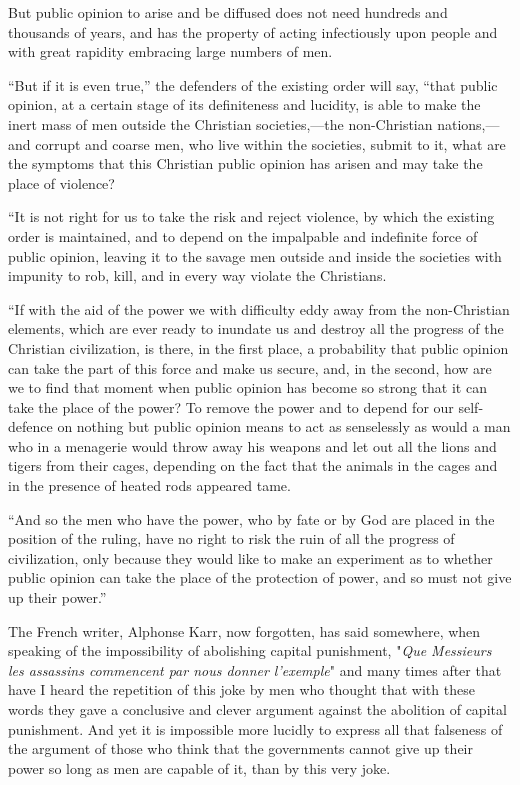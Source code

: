 \documentclass{book}
\begin{document}
But public opinion to arise and be diffused does not need hundreds and thousands of years, and has the property of acting infectiously upon people and with great rapidity embracing large numbers of men.

“But if it is even true,” the defenders of the existing order will say, “that public opinion, at a certain stage of its definiteness and lucidity, is able to make the inert mass of men outside the Christian societies,—the non-Christian nations,—and corrupt and coarse men, who live within the societies, submit to it, what are the symptoms that this Christian public opinion has arisen and may take the place of violence?

“It is not right for us to take the risk and reject violence, by which the existing order is maintained, and to depend on the impalpable and indefinite force of public opinion, leaving it to the savage men outside and inside the societies with impunity to rob, kill, and in every way violate the Christians.

“If with the aid of the power we with difficulty eddy away from the non-Christian elements, which are ever ready to inundate us and destroy all the progress of the Christian civilization, is there, in the first place, a probability that public opinion can take the part of this force and make us secure, and, in the second, how are we to find that moment when public opinion has become so strong that it can take the place of the power? To remove the power and to depend for our self-defence on nothing but public opinion means to act as senselessly as would a man who in a menagerie would throw away his weapons and let out all the lions and tigers from their cages, depending on the fact that the animals in the cages and in the presence of heated rods appeared tame.

“And so the men who have the power, who by fate or by God are placed in the position of the ruling, have no right to risk the ruin of all the progress of civilization, only because they would like to make an experiment as to whether public opinion can take the place of the protection of power, and so must not give up their power.”

The French writer, Alphonse Karr, now forgotten, has said somewhere, when speaking of the impossibility of abolishing capital punishment, "\emph{Que Messieurs les assassins commencent par nous donner l’exemple}" and many times after that have I heard the repetition of this joke by men who thought that with these words they gave a conclusive and clever argument against the abolition of capital punishment. And yet it is impossible more lucidly to express all that falseness of the argument of those who think that the governments cannot give up their power so long as men are capable of it, than by this very joke.
\end{document}

